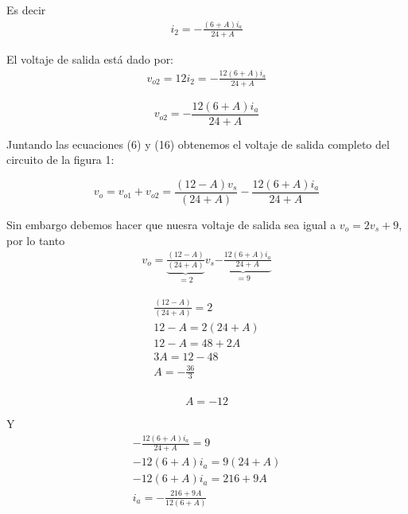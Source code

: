 \documentclass{article}
\begin{document}
	\noindent Es decir
	\begin{align}
		i_2 = -\frac{(6 + A)i_a}{24+A}
	\end{align}
	
	\noindent El voltaje de salida está dado por:
	\begin{align}
		v_{o2} = 12i_2 = -\frac{12(6+A)i_a}{24+A}\nonumber
	\end{align}
	
	\begin{tcolorbox}[colback=red!5!white,colframe=red!75!black,arc=0mm,boxrule=0mm,width=(\linewidth+0.5cm)]
		\begin{equation}
			v_{o2} = -\frac{12(6+A)i_a}{24+A}
		\end{equation}
	\end{tcolorbox}
	
	\noindent Juntando las ecuaciones (6) y (16) obtenemos el voltaje de salida completo del circuito de la figura 1:
	\begin{tcolorbox}[colback=red!5!white,colframe=red!75!black,arc=0mm,boxrule=0mm,width=(\linewidth+0.5cm)]
		\begin{equation}
			v_{o} = v_{o1} + v_{o2} = \frac{(12-A)v_s}{(24+A)} -\frac{12(6+A)i_a}{24+A}
		\end{equation}
	\end{tcolorbox}
	
	\noindent Sin embargo debemos hacer que nuesra voltaje de salida sea igual a $v_o = 2v_s + 9$, por lo tanto
	\begin{align*}
		v_{o} = \underbrace{\frac{(12-A)}{(24+A)}}_{=2} v_s \underbrace{-\frac{12(6+A)i_a}{24+A}}_{=9} 
	\end{align*}
	
	\begin{align*}
		\frac{(12-A)}{(24+A)} = 2\\
		12-A = 2(24 + A)\\
		12-A = 48 + 2A\\
		3A = 12-48\\
		A = -\frac{36}{3}\\
	\end{align*}
	
	\begin{tcolorbox}[colback=red!5!white,colframe=red!75!black,arc=0mm,boxrule=0mm,width=(\linewidth+0.5cm)]
		\begin{equation}
			A = -12
		\end{equation}
	\end{tcolorbox}
	
	\noindent Y
	\begin{align*}
		-\frac{12(6+A)i_a}{24+A}=9\\
		-12(6+A)i_a = 9(24 + A)\\
		-12(6+A)i_a = 216 + 9A\\
		i_a = -\frac{216 + 9A}{12(6+A)}  
	\end{align*}
	
\end{document}
